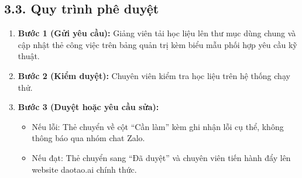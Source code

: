 \documentclass[12pt]{article}
\begin{document}
\subsection*{3.3. Quy trình phê duyệt}
\begin{enumerate}
    \item \textbf{Bước 1 (Gửi yêu cầu):} Giảng viên tải học liệu lên thư mục dùng chung và cập nhật thẻ công việc trên bảng quản trị kèm biểu mẫu phối hợp yêu cầu kỹ thuật.
    \item \textbf{Bước 2 (Kiểm duyệt):} Chuyên viên kiểm tra học liệu trên hệ thống chạy thử.
    \item \textbf{Bước 3 (Duyệt hoặc yêu cầu sửa):} 
    \begin{itemize}
        \item Nếu lỗi: Thẻ chuyển về cột ``Cần làm'' kèm ghi nhận lỗi cụ thể, không thông báo qua nhóm chat Zalo.
        \item Nếu đạt: Thẻ chuyển sang ``Đã duyệt'' và chuyên viên tiến hành đẩy lên website daotao.ai chính thức.
    \end{itemize}
\end{enumerate}
\end{document}
